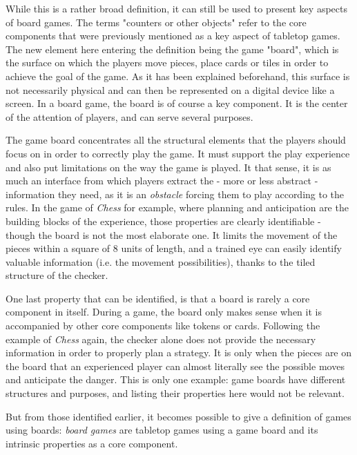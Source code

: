 While this is a rather broad definition, it can still be used to present key aspects of board games. The terms "counters or other objects" refer to the core components that were previously mentioned as a key aspect of tabletop games. The new element here entering the definition being the game "board", which is the surface on which the players move pieces, place cards or tiles in order to achieve the goal of the game. As it has been explained beforehand, this surface is not necessarily physical and can then be represented on a digital device like a screen. In a board game, the board is of course a key component. It is the center of the attention of players, and can serve several purposes.

The game board concentrates all the structural elements that the players should focus on in order to correctly play the game. It must support the play experience and also put limitations on the way the game is played. It that sense, it is as much an interface from which players extract the - more or less abstract - information they need, as it is an \textit{obstacle} forcing them to play according to the rules. 
In the game of \textit{Chess} for example, where planning and anticipation are the building blocks of the experience, those properties are clearly identifiable - though the board is not the most elaborate one. It limits the movement of the pieces within a square of 8 units of length, and a trained eye can easily identify valuable information (i.e. the movement possibilities), thanks to the tiled structure of the checker. 

One last property that can be identified, is that a board is rarely a core component in itself. During a game, the board only makes sense when it is accompanied by other core components like tokens or cards. Following the example of \textit{Chess} again, the checker alone does not provide the necessary information in order to properly plan a strategy. It is only when the pieces are on the board that an experienced player can almost literally see the possible moves and anticipate the danger. 
This is only one example: game boards have different structures and purposes, and listing their properties here would not be relevant. 

But from those identified earlier, it becomes possible to give a definition of games using boards: \textit{board games} are tabletop games using a game board and its intrinsic properties as a core component.

